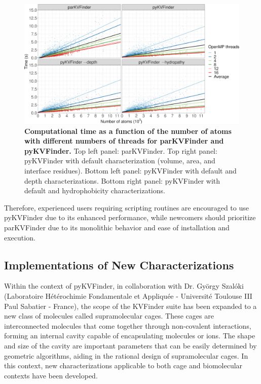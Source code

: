 \documentclass[Ingles]{phdthesis}
\begin{document}
\begin{figure}[h]
  \centering
  \includegraphics[scale=1]{images/pykvfinder-parkvfinder-kv1000-comparison.png}
  \caption[Computational time as a function of the number of atoms with different numbers of threads for parKVFinder and pyKVFinder]{\textbf{Computational time as a function of the number of atoms with different numbers of threads for parKVFinder and pyKVFinder.} Top left panel: parKVFinder. Top right panel: pyKVFinder with default characterization (volume, area, and interface residues). Bottom left panel: pyKVFinder with default and depth characterizations. Bottom right panel: pyKVFinder with default and hydrophobicity characterizations.}
  \label{fig:pykvfinder-parkvfinder-kv1000-comparison}
\end{figure}

Therefore, experienced users requiring scripting routines are encouraged to use pyKVFinder due to its enhanced performance, while newcomers should prioritize parKVFinder due to its monolithic behavior and ease of installation and execution. 

\subsection{Implementations of New Characterizations \label{sec:pykvfinder-implementations}}

Within the context of pyKVFinder, in collaboration with Dr. György Szalóki (Laboratoire Hétérochimie Fondamentale et Appliquée - Université Toulouse III Paul Sabatier - France), the scope of the KVFinder suite has been expanded to a new class of molecules called supramolecular cages. These cages are interconnected molecules that come together through non-covalent interactions, forming an internal cavity capable of encapsulating molecules or ions. The shape and size of the cavity are important parameters that can be easily determined by geometric algorithms, aiding in the rational design of supramolecular cages. In this context, new characterizations applicable to both cage and biomolecular contexts have been developed.
\end{document}
